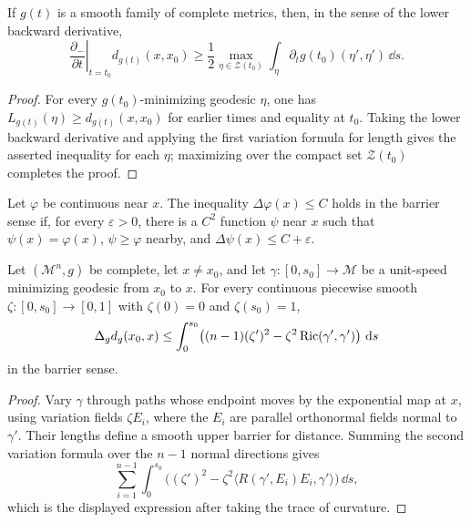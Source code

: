 \begin{lemma}
\label{lem:chow-iii-backward-distance-derivative}

If \(g(t)\) is a smooth family of complete metrics, then, in the sense of the
lower backward derivative,
\[
 \left.\frac{\partial_-}{\partial t}\right|_{t=t_0}d_{g(t)}(x,x_0)
 \ge\frac12\max_{\eta\in\mathcal Z(t_0)}
 \int_\eta\partial_tg(t_0)(\eta',\eta')\,\dd s.
\]
\end{lemma}
\begin{proof}
\sketch For every \(g(t_0)\)-minimizing geodesic \(\eta\), one has
\(L_{g(t)}(\eta)\ge d_{g(t)}(x,x_0)\) for earlier times and equality at
\(t_0\).  Taking the lower backward derivative and applying the first
variation formula for length gives the asserted inequality for each \(\eta\);
maximizing over the compact set \(\mathcal Z(t_0)\) completes the proof.
\end{proof}

\begin{definition}
\label{def:chow-iii-laplacian-upper-barrier}

Let \(\varphi\) be continuous near \(x\).  The inequality
\(\Delta\varphi(x)\le C\) holds in the barrier sense if, for every
\(\varepsilon>0\), there is a \(C^2\) function \(\psi\) near \(x\) such that
\(\psi(x)=\varphi(x)\), \(\psi\ge\varphi\) nearby, and
\(\Delta\psi(x)\le C+\varepsilon\).
\end{definition}

\begin{lemma}
\label{lem:chow-iii-distance-laplacian-upper-bound}


Let \((\mathcal M^n,g)\) be complete, let \(x\ne x_0\), and let
\(\gamma:[0,s_0]\to\mathcal M\) be a unit-speed minimizing geodesic from
\(x_0\) to \(x\).  For every continuous piecewise smooth
\(\zeta:[0,s_0]\to[0,1]\) with \(\zeta(0)=0\) and \(\zeta(s_0)=1\),
\[
 \Delta_gd_g(x_0,x)\le\int_0^{s_0}
 \bigl((n-1)(\zeta')^2-\zeta^2\operatorname{Ric}(\gamma',\gamma')\bigr)\,\,\mathrm{d} s
\]
in the barrier sense.
\end{lemma}
\begin{proof}
\sketch Vary \(\gamma\) through paths whose endpoint moves by the exponential map at
\(x\), using variation fields \(\zeta E_i\), where the \(E_i\) are parallel
orthonormal fields normal to \(\gamma'\).  Their lengths define a smooth upper
barrier for distance.  Summing the second variation formula over the
\(n-1\) normal directions gives
\[
 \sum_{i=1}^{n-1}\int_0^{s_0}
 \bigl((\zeta')^2-\zeta^2\langle R(\gamma',E_i)E_i,\gamma'\rangle\bigr)\,\dd s,
\]
which is the displayed expression after taking the trace of curvature.
\end{proof}


